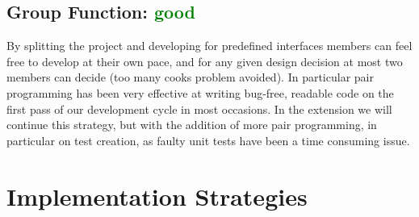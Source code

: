 \documentclass[11pt]{article}
\begin{document}
    \subsection*{Group Function: \textcolor{green}{good}}
        By splitting the project and developing for predefined interfaces members can feel free to develop at their own pace, and for any given design decision at most two members can decide (too many cooks problem avoided).
        In particular pair programming has been very effective at writing bug-free, readable code on the first pass of our development cycle in most occasions.
        \newline\newline
        In the extension we will continue this strategy, but with the addition of more pair programming, in particular on test creation, as faulty unit tests have been a time consuming issue. 

\section{Implementation Strategies}
\end{document}
